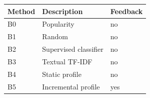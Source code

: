 \begin{tabular}{lll}
\toprule
Method & Description & Feedback \\
\midrule
B0 & Popularity & no \\
B1 & Random & no \\
B2 & Supervised classifier & no \\
B3 & Textual TF-IDF & no \\
B4 & Static profile & no \\
B5 & Incremental profile & yes \\
\bottomrule
\end{tabular}
